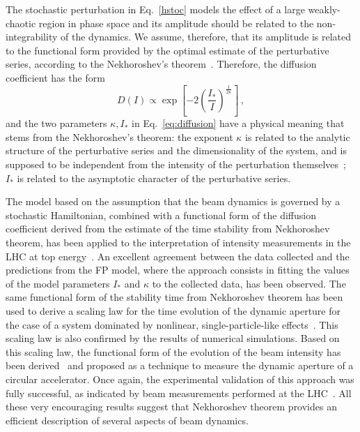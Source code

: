 The stochastic perturbation in Eq.~\eqref{hstoc} models the effect
of a large weakly-chaotic region in phase space and its amplitude should be related to the non-integrability of the dynamics. We assume, therefore, that its amplitude is related to the functional form provided by the optimal estimate of the perturbative series, according to the Nekhoroshev's theorem~\cite{Turchetti:1990aa,Bazzani:1990aa}. Therefore, the diffusion coefficient has the form
\begin{equation}
    D(I)\propto\exp \left[-2\left(\frac{I_\ast}{I}\right)^{\frac{1}{2\kappa}}\right]\, , 
    \label{eq:diffusion}
\end{equation}
and the two parameters $\kappa, I_\ast$ in Eq.~\eqref{eq:diffusion} have a physical meaning that stems from the Nekhoroshev's theorem: the exponent $\kappa$ is related to the analytic structure of the perturbative series and the dimensionality of the system, and is supposed to be independent from the intensity of the perturbation themselves~\cite{bazzani2020diffusion}; $I_\ast$ is related to the asymptotic character of the perturbative series. 

{The model based on the assumption that the beam dynamics is governed by a stochastic Hamiltonian, combined with a functional form of the diffusion coefficient derived from the estimate of the time stability from Nekhoroshev theorem, has been applied to the interpretation of intensity measurements in the LHC at top energy~\cite{bazzani2020diffusion}. An excellent agreement between the data collected and the predictions from the FP model, where the approach consists in fitting the values of the model parameters $I_\ast$ and $\kappa$ to the collected data, has been observed. The same functional form of the stability time from Nekhoroshev theorem has been used to derive a scaling law for the time evolution of the dynamic aperture for the case of a system dominated by nonlinear, single-particle-like effects~\cite{PhysRevE.57.3432,Bazzani:2019csk}. This scaling law is also confirmed by the results of numerical simulations. Based on this scaling law, the functional form of the evolution of the beam intensity has been derived~\cite{PhysRevSTAB.15.024001} and proposed as a technique to measure the dynamic aperture of a circular accelerator. Once again, the experimental validation of this approach was fully successful, as indicated by beam measurements performed at the LHC~\cite{PhysRevAccelBeams.22.034002}. All these very encouraging results suggest that Nekhoroshev theorem provides an efficient description of several aspects of beam dynamics.}

